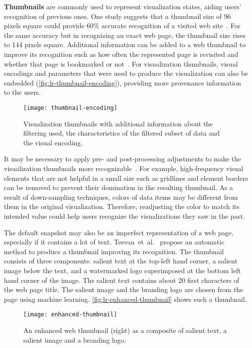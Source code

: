 \textbf{Thumbnails} are commonly used to represent visualization states, aiding users' recognition of previous ones. One study suggests that a thumbnail size of 96 pixels square could provide 60\% accurate recognition of a visited web site~\cite{Kaasten2001}. For the same accuracy but in recognizing an exact web page, the thumbnail size rises to 144 pixels square. Additional information can be added to a web thumbnail to improve its recognition such as how often the represented page is revisited and whether that page is bookmarked or not~\cite{Cockburn1999}. For visualization thumbnails, visual encodings and parameters that were used to produce the visualization can also be embedded (\autoref{fig:lr-thumbnail-encoding}), providing more provenance information to the users.

\begin{figure}[!htb]
	\centering
	\texttt{[image: thumbnail-encoding]}
	\caption{Visualization thumbnails with additional information about the filtering used, the characteristics of the filtered subset of data and the visual encoding. }
	\label{fig:lr-thumbnail-encoding}
\end{figure}

It may be necessary to apply pre- and post-processing adjustments to make the visualization thumbnails more recognizable~\cite{Heer2008}. For example, high-frequency visual elements that are not helpful in a small size such as gridlines and element borders can be removed to prevent their domination in the resulting thumbnail. As a result of down-sampling techniques, colors of data items may be different from them in the original visualization. Therefore, readjusting the color to match its intended value could help users recognize the visualizations they saw in the past.

The default snapshot may also be an imperfect representation of a web page, especially if it contains a lot of text. Teevan~et~al.~\cite{Teevan2009} propose an automatic method to produce a thumbnail improving its recognition. The thumbnail consists of three components: salient text at the top-left hand corner, a salient image below the text, and a watermarked logo superimposed at the bottom left hand corner of the image. The salient text contains about 20 first characters of the web page title. The salient image and the branding logo are chosen from the page using machine learning. \autoref{fig:lr-enhanced-thumbnail} shows such a thumbnail.

\begin{figure}[!htb]
	\centering
	\texttt{[image: enhanced-thumbnail]}
	\caption{An enhanced web thumbnail (right) as a composite of salient text, a salient image and a branding logo. }
	\label{fig:lr-enhanced-thumbnail}
\end{figure}


